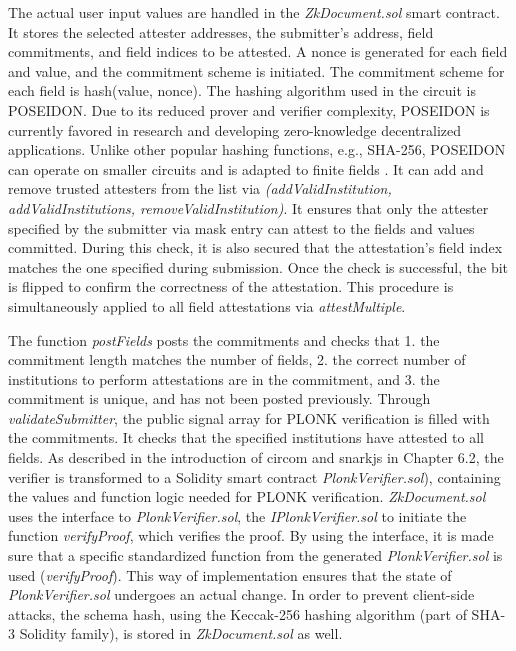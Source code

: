 The actual user input values are handled in the \textit{ZkDocument.sol} smart contract. It stores the selected attester addresses, the submitter's address, field commitments, and field indices to be attested. A nonce is generated for each field and value, and the commitment scheme is initiated. The commitment scheme for each field is hash(value, nonce). The hashing algorithm used in the circuit is POSEIDON. Due to its reduced prover and verifier complexity, POSEIDON is currently favored in research and developing zero-knowledge decentralized applications. Unlike other popular hashing functions, e.g., SHA-256, POSEIDON can operate on smaller circuits and is adapted to finite fields \citep{poseidon}. It can add and remove trusted attesters from the list via \textit{(addValidInstitution, addValidInstitutions, removeValidInstitution)}. It ensures that only the attester specified by the submitter via mask entry can attest to the fields and values committed. During this check, it is also secured that the attestation's field index matches the one specified during submission. Once the check is successful, the bit is flipped to confirm the correctness of the attestation. This procedure is simultaneously applied to all field attestations via \textit{attestMultiple}. 

The function \textit{postFields} posts the commitments and checks that 1. the commitment length matches the number of fields, 2. the correct number of institutions to perform attestations are in the commitment, and 3. the commitment is unique, and has not been posted previously. Through \textit{validateSubmitter}, the public signal array for PLONK verification is filled with the commitments. It checks that the specified institutions have attested to all fields. As described in the introduction of circom and snarkjs in Chapter 6.2, the verifier is transformed to a Solidity smart contract \textit{PlonkVerifier.sol}), containing the values and function logic needed for PLONK verification. \textit{ZkDocument.sol} uses the interface to \textit{PlonkVerifier.sol}, the \textit{IPlonkVerifier.sol} to initiate the function \textit{verifyProof}, which verifies the proof. By using the interface, it is made sure that a specific standardized function from the generated \textit{PlonkVerifier.sol} is used (\textit{verifyProof}). This way of implementation ensures that the state of \textit{PlonkVerifier.sol} undergoes an actual change. In order to prevent client-side attacks, the schema hash, using the Keccak-256 hashing algorithm (part of SHA-3 Solidity family), is stored in \textit{ZkDocument.sol} as well. 

